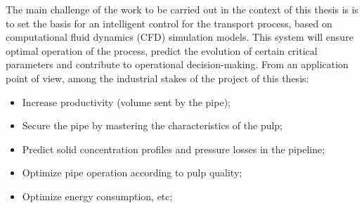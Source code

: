 \documentclass[11pt]{report}
\begin{document}
The main challenge of the work to be carried out in the context of this thesis is is to set the basis for an intelligent control for the transport process, based on computational fluid dynamics (CFD) simulation models.
%
This system will ensure optimal operation of the process, predict the evolution of certain critical parameters and contribute to operational decision-making.
%
From an application point of view, among the industrial stakes of the project of this thesis:
%
\begin{itemize}
\item Increase productivity (volume sent by the pipe);
\item Secure the pipe by mastering the characteristics of the pulp;
\item Predict solid concentration profiles and pressure losses in the pipeline;
\item Optimize pipe operation according to pulp quality;
\item Optimize energy consumption, etc;
\end{itemize}
\end{document}
